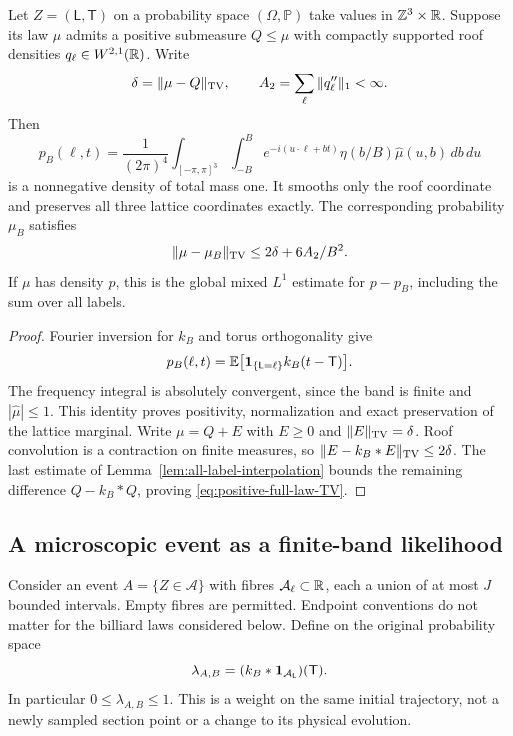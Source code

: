 \begin{theorem}
\label{thm:positive-spectral-approximation}
Let $Z=(\mathsf L,\mathsf T)$ on a probability space
$(\Omega,\mathbb P)$ take values in $\mathbb Z^3\times\mathbb R$. Suppose its law
$\mu$ admits a positive submeasure $Q\le\mu$ with compactly supported
roof densities $q_\ell\in W^{2,1}(\mathbb R)$. Write
\[
 \delta=\|\mu-Q\|_{\operatorname{TV}},\qquad
 A_2=\sum_\ell\|q''_\ell\|_1<\infty.
\]
Then
\begin{equation}\label{eq:positive-full-law-density}
 p_B(\ell,t)=\frac1{(2\pi)^4}
  \int_{[-\pi,\pi]^3}\int_{-B}^B
 e^{-i(u\cdot\ell+bt)}\eta(b/B)\widehat\mu(u,b)\,db\,du
\end{equation}
is a nonnegative density of total mass one. It smooths only the roof
coordinate and preserves all three lattice coordinates exactly. The
corresponding probability $\mu_B$ satisfies
\begin{equation}\label{eq:positive-full-law-TV}
 \|\mu-\mu_B\|_{\TV}\le2\delta+6A_2/B^2.
\end{equation}
If $\mu$ has density $p$, this is the global mixed $L^1$ estimate for
$p-p_B$, including the sum over all labels.
\end{theorem}
\begin{proof}
Fourier inversion for $k_B$ and torus orthogonality give
\[
 p_B(\ell,t)
   =\mathbb E\bigl[\mathbf1_{\{\mathsf L=\ell\}}
                                      k_B(t-\mathsf T)\bigr].
\]
The frequency integral is absolutely convergent, since the band is
finite and $|\widehat\mu|\le1$. This identity proves positivity,
normalization and exact preservation of the lattice marginal.
Write $\mu=Q+E$ with $E\ge0$ and $\|E\|_{\operatorname{TV}}=\delta$.
Roof convolution is a contraction on finite measures, so
$\|E-k_B*E\|_{\operatorname{TV}}\le2\delta$. The last estimate of
Lemma~\ref{lem:all-label-interpolation} bounds the remaining difference
$Q-k_B*Q$, proving \eqref{eq:positive-full-law-TV}.
\end{proof}

\subsection{A microscopic event as a finite-band likelihood}
Consider an event $A=\{Z\in\mathcal A\}$ with fibres
$\mathcal A_\ell\subset\mathbb R$, each a union of at most $J$ bounded
intervals. Empty fibres are permitted. Endpoint conventions do not
matter for the billiard laws considered below. Define on the original
probability space
\begin{equation}\label{eq:positive-event-likelihood}
 \lambda_{A,B}
       =(k_B*\one_{\mathcal A_{\mathsf L}})(\mathsf T).
\end{equation}
In particular $0\le\lambda_{A,B}\le1$. This is a weight on the same
initial trajectory, not a newly sampled section point or a change to
its physical evolution.

